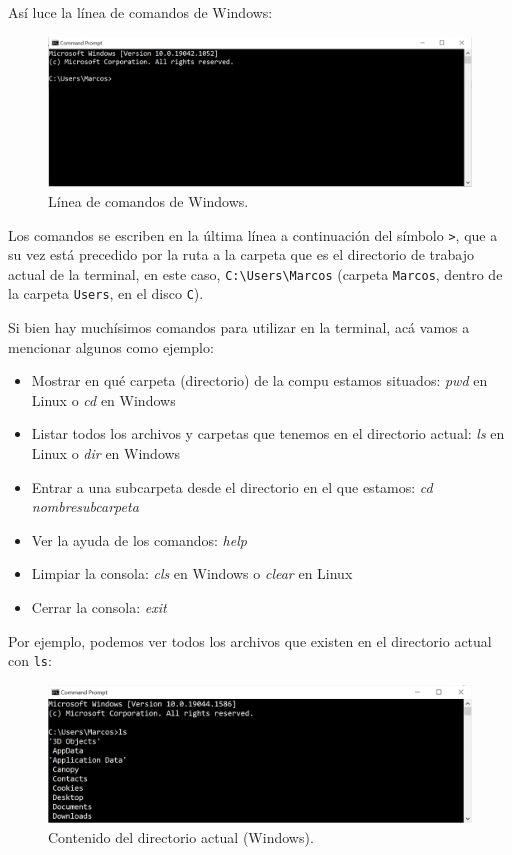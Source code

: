 \documentclass[
]{book}
\providecommand{\tightlist}{%
  \setlength{\itemsep}{0pt}\setlength{\parskip}{0pt}}
\begin{document}
Así luce la línea de comandos de Windows:

\begin{figure}

{\centering \includegraphics[width=0.8\linewidth]{images/07_otros/terminal2} 

}

\caption{Línea de comandos de Windows.}\label{fig:unnamed-chunk-107}
\end{figure}

Los comandos se escriben en la última línea a continuación del símbolo \texttt{\textgreater{}}, que a su vez está precedido por la ruta a la carpeta que es el directorio de trabajo actual de la terminal, en este caso, \texttt{C:\textbackslash{}Users\textbackslash{}Marcos} (carpeta \texttt{Marcos}, dentro de la carpeta \texttt{Users}, en el disco \texttt{C}).

Si bien hay muchísimos comandos para utilizar en la terminal, acá vamos a mencionar algunos como ejemplo:

\begin{itemize}
\tightlist
\item
  Mostrar en qué carpeta (directorio) de la compu estamos situados: \emph{pwd} en Linux o \emph{cd} en Windows
\item
  Listar todos los archivos y carpetas que tenemos en el directorio actual: \emph{ls} en Linux o \emph{dir} en Windows
\item
  Entrar a una subcarpeta desde el directorio en el que estamos: \emph{cd nombresubcarpeta}
\item
  Ver la ayuda de los comandos: \emph{help}
\item
  Limpiar la consola: \emph{cls} en Windows o \emph{clear} en Linux
\item
  Cerrar la consola: \emph{exit}
\end{itemize}

Por ejemplo, podemos ver todos los archivos que existen en el directorio actual con \texttt{ls}:

\begin{figure}

{\centering \includegraphics[width=0.8\linewidth]{images/07_otros/terminal3} 

}

\caption{Contenido del directorio actual (Windows).}\label{fig:unnamed-chunk-108}
\end{figure}
\end{document}
